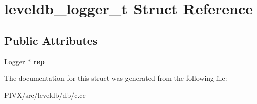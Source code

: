 \hypertarget{structleveldb__logger__t}{}\section{leveldb\+\_\+logger\+\_\+t Struct Reference}
\label{structleveldb__logger__t}
\subsection*{Public Attributes}
\begin{DoxyCompactItemize}
\item 
\mbox{\label{structleveldb__logger__t_aa27dd9e07077dbde7b776c8f548c749b}} 
\mbox{\hyperlink{classleveldb_1_1_logger}{Logger}} $\ast$ {\bfseries rep}
\end{DoxyCompactItemize}


The documentation for this struct was generated from the following file\+:\begin{DoxyCompactItemize}
\item 
P\+I\+V\+X/src/leveldb/db/c.\+cc\end{DoxyCompactItemize}
